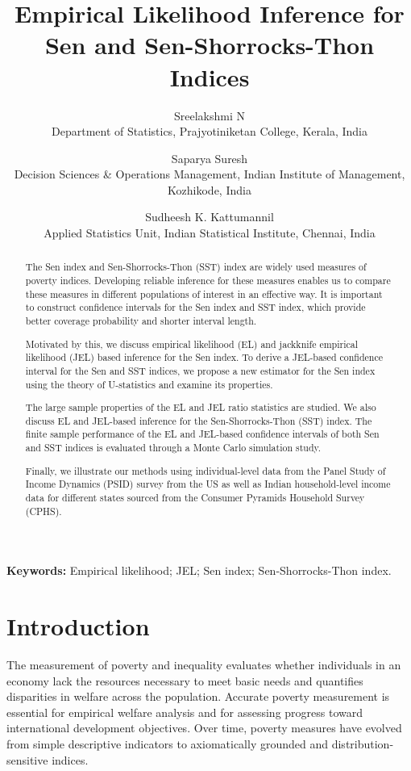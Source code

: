 \documentclass[11pt]{article}
\begin{document}
\title{Empirical Likelihood Inference for Sen and Sen-Shorrocks-Thon Indices}

\author{
Sreelakshmi N\\
\small Department of Statistics, Prajyotiniketan College, Kerala, India
\and
Saparya Suresh\\
\small Decision Sciences \& Operations Management, Indian Institute of Management, Kozhikode, India
\and
Sudheesh K. Kattumannil\\
\small Applied Statistics Unit, Indian Statistical Institute, Chennai, India
}

\date{}
\maketitle

\begin{abstract}
The Sen index and Sen-Shorrocks-Thon (SST) index are widely used measures of poverty indices. Developing reliable inference for these measures enables us to compare these measures in different populations of interest in an effective way. It is important to construct confidence intervals for the Sen index and SST index, which provide better coverage probability and shorter interval length.

Motivated by this, we discuss empirical likelihood (EL) and jackknife empirical likelihood (JEL) based inference for the Sen index. To derive a JEL-based confidence interval for the Sen and SST indices, we propose a new estimator for the Sen index using the theory of U-statistics and examine its properties.

The large sample properties of the EL and JEL ratio statistics are studied. We also discuss EL and JEL-based inference for the Sen-Shorrocks-Thon (SST) index. The finite sample performance of the EL and JEL-based confidence intervals of both Sen and SST indices is evaluated through a Monte Carlo simulation study.

Finally, we illustrate our methods using individual-level data from the Panel Study of Income Dynamics (PSID) survey from the US as well as Indian household-level income data for different states sourced from the Consumer Pyramids Household Survey (CPHS).
\end{abstract}

\noindent \textbf{Keywords:} Empirical likelihood; JEL; Sen index; Sen-Shorrocks-Thon index.
\section{Introduction}\label{sec1}
The measurement of poverty and inequality evaluates whether individuals in an economy lack the resources necessary to meet basic needs and quantifies disparities in welfare across the population. Accurate poverty measurement is essential for empirical welfare analysis and for assessing progress toward international development objectives. Over time, poverty measures have evolved from simple descriptive indicators to axiomatically grounded and distribution-sensitive indices.
\end{document}

